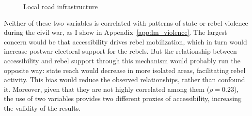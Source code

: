 \documentclass[12pt, notitlepage]{article}
\begin{document}
\begin{figure}[!ht]
    \centering

    \begin{minipage}{1\textwidth}
      \centering
      \hspace{25pt}
    \end{minipage}

    \caption{Local road infrastructure} \label{fig:map_roads}

\end{figure}


Neither of these two variables is correlated with patterns of state or rebel violence during the civil war, as I show in Appendix~\ref{app:lm_violence}.
The largest concern would be that accessibility drives rebel mobilization, which in turn would increase postwar electoral support for the rebels.
But the relationship between accessibility and rebel support through this mechanism would probably run the opposite way: state reach would decrease in more isolated areas, facilitating rebel activity.
This bias would reduce the observed relationships, rather than confound it.
Moreover, given that they are not highly correlated among them ($\rho = 0.23$), the use of two variables provides two different proxies of accessibility, increasing the validity of the results.
\end{document}
